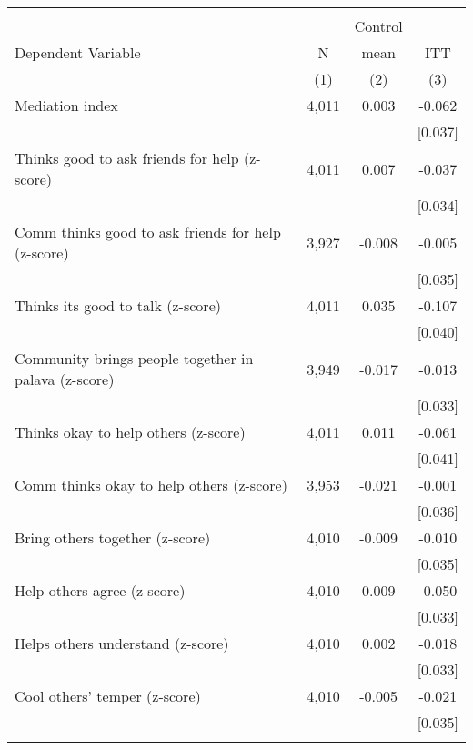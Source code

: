 \begin{tabular}{lccc}
\hline \noalign{\smallskip} &  &  & \\
 &  & Control & \\
Dependent Variable & N & mean & ITT\\
 & (1) & (2) & (3)\\
\noalign{\smallskip}\hline \noalign{\smallskip}Mediation index & 4,011 & 0.003 & -0.062\\
 &  &  & [0.037]\\
\quad Thinks good to ask friends for help (z-score) & 4,011 & 0.007 & -0.037\\
 &  &  & [0.034]\\
\quad Comm thinks good to ask friends for help (z-score) & 3,927 & -0.008 & -0.005\\
 &  &  & [0.035]\\
\quad Thinks its good to talk (z-score) & 4,011 & 0.035 & -0.107\\
 &  &  & [0.040]\\
\quad Community brings people together in palava (z-score) & 3,949 & -0.017 & -0.013\\
 &  &  & [0.033]\\
\quad Thinks okay to help others (z-score) & 4,011 & 0.011 & -0.061\\
 &  &  & [0.041]\\
\quad Comm thinks okay to help others (z-score) & 3,953 & -0.021 & -0.001\\
 &  &  & [0.036]\\
\quad Bring others together (z-score) & 4,010 & -0.009 & -0.010\\
 &  &  & [0.035]\\
\quad Help others agree (z-score) & 4,010 & 0.009 & -0.050\\
 &  &  & [0.033]\\
\quad Helps others understand (z-score) & 4,010 & 0.002 & -0.018\\
 &  &  & [0.033]\\
\quad Cool others' temper (z-score) & 4,010 & -0.005 & -0.021\\
 &  &  & [0.035]\\
\noalign{\smallskip}\hline\end{tabular}
